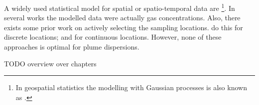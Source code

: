 A widely used statistical model for spatial or spatio-temporal data are 
\footnote{In geospatial statistics the modelling 
    with Gaussian processes is also known as .}. In several 
works \parencite[e.g.][]{Stachniss:2008vz, Marchant:2012wb} the modelled data 
were actually gas concentrations. Also, there exists some prior work on actively 
selecting the sampling locations. \Textcite{Stranders:2008wl} do this for 
discrete locations; \textcite{Singh:2010wt} and \textcite{Marchant:2012wb} for 
continuous locations. However, none of these approaches is optimal for plume 
dispersions.

TODO overview over chapters
